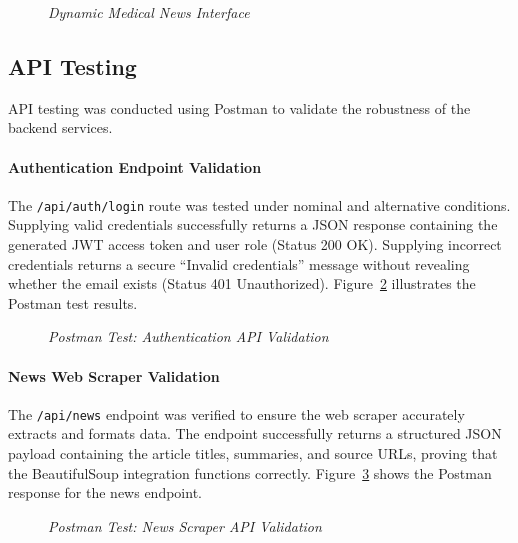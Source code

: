\begin{figure}[H]
    \centering
    \caption{\textit{Dynamic Medical News Interface}}
    \label{fig:ui_blog}
\end{figure}

\subsection{API Testing}
API testing was conducted using Postman to validate the robustness of the backend services.

\paragraph{Authentication Endpoint Validation}
The \texttt{/api/auth/login} route was tested under nominal and alternative conditions. Supplying valid credentials successfully returns a JSON response containing the generated JWT access token and user role (Status 200 OK). Supplying incorrect credentials returns a secure ``Invalid credentials'' message without revealing whether the email exists (Status 401 Unauthorized). Figure~\ref{fig:api_login} illustrates the Postman test results.

\begin{figure}[H]
    \centering
    \caption{\textit{Postman Test: Authentication API Validation}}
    \label{fig:api_login}
\end{figure}

\paragraph{News Web Scraper Validation}
The \texttt{/api/news} endpoint was verified to ensure the web scraper accurately extracts and formats data. The endpoint successfully returns a structured JSON payload containing the article titles, summaries, and source URLs, proving that the BeautifulSoup integration functions correctly. Figure~\ref{fig:api_news} shows the Postman response for the news endpoint.

\begin{figure}[H]
    \centering
    \caption{\textit{Postman Test: News Scraper API Validation}}
    \label{fig:api_news}
\end{figure}

